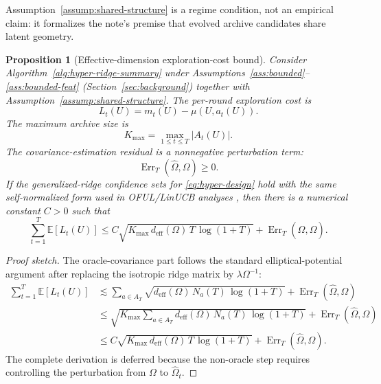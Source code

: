 \documentclass{article} %
\newtheorem{proposition}[theorem]{Proposition}
\begin{document}
Assumption~\ref{assump:shared-structure} is a regime condition, not an empirical claim: it formalizes the note's premise that evolved archive candidates share latent geometry.

\begin{proposition}[Effective-dimension exploration-cost bound]
\label{prop:deff-bound}
Consider Algorithm~\ref{alg:hyper-ridge-summary} under Assumptions~\ref{ass:bounded}--\ref{ass:bounded-feat} (Section~\ref{sec:background}) together with Assumption~\ref{assump:shared-structure}. The per-round exploration cost is
\begin{equation}
\label{eq:hyper-lt}
L_t(U)
=
m_t(U)-\mu(U,a_t(U)).
\end{equation}
The maximum archive size is
\begin{equation}
\label{eq:hyper-kmax}
K_{\max}
=
\max_{1\le t\le T}|A_t(U)|.
\end{equation}
The covariance-estimation residual is a nonnegative perturbation term:
\begin{equation}
\label{eq:hyper-err}
\operatorname{Err}_{T}(\widehat{\Omega},\Omega)
\ge
0.
\end{equation}
If the generalized-ridge confidence sets for \eqref{eq:hyper-design} hold with the same self-normalized form used in OFUL/LinUCB analyses \citep{abbasi2011oful,chu2011linucb}, then there is a numerical constant \(C>0\) such that
\begin{equation}
\label{eq:hyper-deff-bound}
\sum_{t=1}^{T}
\mathbb{E}[L_t(U)]
\le
C
\sqrt{
K_{\max}\,
d_{\mathrm{eff}}(\Omega)\,
T\,
\log(1+T)
}
+
\operatorname{Err}_{T}(\widehat{\Omega},\Omega).
\end{equation}
\end{proposition}

\begin{proof}[Proof sketch]
The oracle-covariance part follows the standard elliptical-potential argument after replacing the isotropic ridge matrix by \(\lambda\Omega^{-1}\):
\begin{align}
\sum_{t=1}^{T}\mathbb{E}[L_t(U)]
&\lesssim
\sum_{a\in A_T}
\sqrt{
d_{\mathrm{eff}}(\Omega)\,
N_a(T)\,
\log(1+T)
}
+
\operatorname{Err}_{T}(\widehat{\Omega},\Omega)
\nonumber\\
&\le
\sqrt{
K_{\max}
\sum_{a\in A_T}
d_{\mathrm{eff}}(\Omega)\,
N_a(T)\,
\log(1+T)
}
+
\operatorname{Err}_{T}(\widehat{\Omega},\Omega)
\nonumber\\
&\le
C
\sqrt{
K_{\max}\,
d_{\mathrm{eff}}(\Omega)\,
T\,
\log(1+T)
}
+
\operatorname{Err}_{T}(\widehat{\Omega},\Omega).
\label{eq:hyper-proof-sketch}
\end{align}
The complete derivation is deferred because the non-oracle step requires controlling the perturbation from \(\Omega\) to \(\widehat{\Omega}_t\).
\end{proof}
\end{document}

